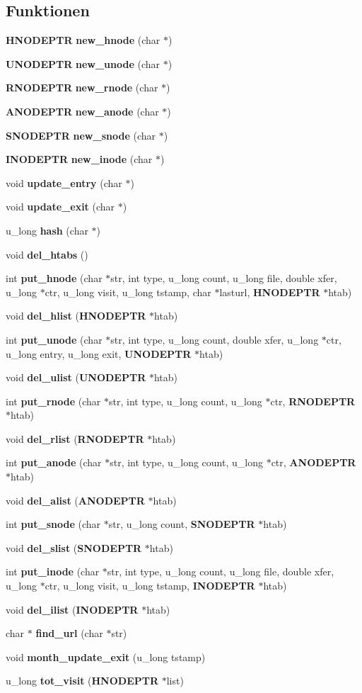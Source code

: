 \subsection*{Funktionen}
\begin{CompactItemize}
\item 
{\bf HNODEPTR} {\bf new\_\-hnode} (char $\ast$)
\item 
{\bf UNODEPTR} {\bf new\_\-unode} (char $\ast$)
\item 
{\bf RNODEPTR} {\bf new\_\-rnode} (char $\ast$)
\item 
{\bf ANODEPTR} {\bf new\_\-anode} (char $\ast$)
\item 
{\bf SNODEPTR} {\bf new\_\-snode} (char $\ast$)
\item 
{\bf INODEPTR} {\bf new\_\-inode} (char $\ast$)
\item 
void {\bf update\_\-entry} (char $\ast$)
\item 
void {\bf update\_\-exit} (char $\ast$)
\item 
u\_\-long {\bf hash} (char $\ast$)
\item 
void {\bf del\_\-htabs} ()
\item 
int {\bf put\_\-hnode} (char $\ast$str, int type, u\_\-long count, u\_\-long file, double xfer, u\_\-long $\ast$ctr, u\_\-long visit, u\_\-long tstamp, char $\ast$lasturl, {\bf HNODEPTR} $\ast$htab)
\item 
void {\bf del\_\-hlist} ({\bf HNODEPTR} $\ast$htab)
\item 
int {\bf put\_\-unode} (char $\ast$str, int type, u\_\-long count, double xfer, u\_\-long $\ast$ctr, u\_\-long entry, u\_\-long exit, {\bf UNODEPTR} $\ast$htab)
\item 
void {\bf del\_\-ulist} ({\bf UNODEPTR} $\ast$htab)
\item 
int {\bf put\_\-rnode} (char $\ast$str, int type, u\_\-long count, u\_\-long $\ast$ctr, {\bf RNODEPTR} $\ast$htab)
\item 
void {\bf del\_\-rlist} ({\bf RNODEPTR} $\ast$htab)
\item 
int {\bf put\_\-anode} (char $\ast$str, int type, u\_\-long count, u\_\-long $\ast$ctr, {\bf ANODEPTR} $\ast$htab)
\item 
void {\bf del\_\-alist} ({\bf ANODEPTR} $\ast$htab)
\item 
int {\bf put\_\-snode} (char $\ast$str, u\_\-long count, {\bf SNODEPTR} $\ast$htab)
\item 
void {\bf del\_\-slist} ({\bf SNODEPTR} $\ast$htab)
\item 
int {\bf put\_\-inode} (char $\ast$str, int type, u\_\-long count, u\_\-long file, double xfer, u\_\-long $\ast$ctr, u\_\-long visit, u\_\-long tstamp, {\bf INODEPTR} $\ast$htab)
\item 
void {\bf del\_\-ilist} ({\bf INODEPTR} $\ast$htab)
\item 
char $\ast$ {\bf find\_\-url} (char $\ast$str)
\item 
void {\bf month\_\-update\_\-exit} (u\_\-long tstamp)
\item 
u\_\-long {\bf tot\_\-visit} ({\bf HNODEPTR} $\ast$list)
\end{CompactItemize}
